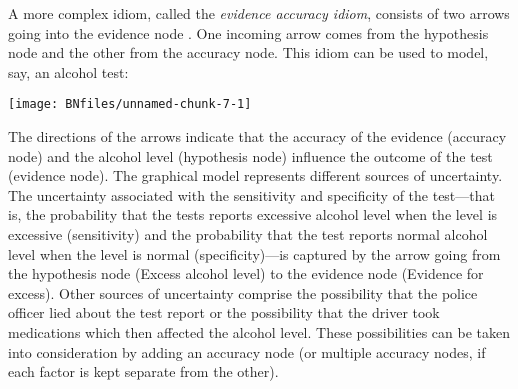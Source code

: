 \documentclass{article}
\begin{document}
A more complex idiom, called the \emph{evidence accuracy
idiom}, consists of two arrows going into the evidence node \citep{bovens2004bayesian, friedman1974}. One incoming arrow comes from the hypothesis node and the other from the accuracy node. This idiom can be used to model, say, 
an alcohol test:
%
\begin{center}\texttt{[image: BNfiles/unnamed-chunk-7-1]} \end{center}
%
\noindent The directions of the arrows indicate that the accuracy of the evidence (accuracy node) and the alcohol level (hypothesis node) influence the outcome of the test (evidence node). The graphical model represents different sources of uncertainty. The uncertainty associated with the sensitivity and specificity of the test---that is, the probability that the tests reports excessive alcohol level when the level is excessive (sensitivity) and the probability that the test reports normal alcohol level when the level is normal (specificity)---is captured by the arrow  going from the hypothesis node (\textsf{Excess alcohol level}) to the evidence node (\textsf{Evidence for excess}). Other sources of uncertainty comprise the possibility that the police officer lied about the test report or
the possibility that the driver took medications which then affected the alcohol level. These possibilities can be taken into consideration by adding an accuracy node (or multiple accuracy nodes, if each factor is kept separate from the other).





\end{document}
